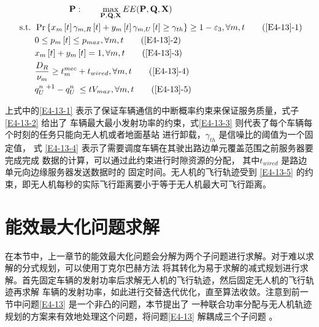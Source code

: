 \begin{align}
& \qquad\qquad\textbf{P}:\qquad \max_{ \mathbf{P}, \mathbf{Q}, \mathbf{X} }  EE(\mathbf{P}, \mathbf{Q}, \mathbf{X})                \label{E4-13}\\
\text { s.t. }
& \Pr\left\{x_m\left[t\right]\gamma_{m,R}\left[t\right]+y_m\left[t\right]\gamma_{m,U}\left[t\right]\geq \gamma_{th}\right\}\geq1-\varepsilon_3, \forall m,t   \tag{\ref{E4-13}{-1}}      \label{E4-13-1}\\  %
& 0\le p_m\left[t\right]\le p_{max}, \forall m,t                                                                                                              \tag{\ref{E4-13}{-2}}      \label{E4-13-2}\\  %
& x_m\left[t\right] + y_m\left[t\right]=1, \forall m,t                                                                                                        \tag{\ref{E4-13}{-3}}      \label{E4-13-3}\\  %
& \frac{D_R}{\nu_m} \geq t_{m}^{mec}+t_{wired} , \forall m,t                                                                                                  \tag{\ref{E4-13}{-4}}      \label{E4-13-4}\\  %
& q_U^{n\mathrm{\ }+1}-q_U^{n\mathrm{\ }}\le tV_{max}, \forall m,t                                                                                            \tag{\ref{E4-13}{-5}}      \label{E4-13-5}    %
\end{align}

上式中的\eqref{E4-13-1} 表示了保证车辆通信的中断概率约束来保证服务质量，式子\eqref{E4-13-2} 给出了
车辆最大最小发射功率的约束，式\eqref{E4-13-3} 则代表了每个车辆每个时刻的任务只能向无人机或者地面基站
进行卸载，$\gamma_{th}$ 是信噪比的阈值为一个固定值，%
式 \eqref{E4-13-4} 表示了需要调度车辆在其驶出路边单元覆盖范围之前服务器要完成完成
数据的计算，可以通过此约束进行时隙资源的分配，
其中$t_{wired}$ 是路边单元向边缘服务器发送数据时的
固定时间。无人机的飞行轨迹受到 \eqref{E4-13-5} 的约束，即无人机每秒的实际飞行距离要小于等于无人机最大可飞行距离。
\section{能效最大化问题求解}\label{section4-3}
在本节中，上一章节的能效最大化问题会分解为两个子问题进行求解。对于难以求解的分式规划，可以使用丁克尔巴赫方法
将其转化为易于求解的减式规划进行求解。首先固定车辆的发射功率后求解无人机的飞行轨迹，然后固定无人机的飞行轨迹再求解
车辆的发射功率，如此进行交替迭代优化，直至算法收敛。注意到前一节中问题\eqref{E4-13} 是一个非凸的问题，本节提出了
一种联合功率分配与无人机轨迹规划的方案来有效地处理这个问题，将问题\eqref{E4-13} 解耦成三个子问题 \supercite{JointTrajectory9627548}。
